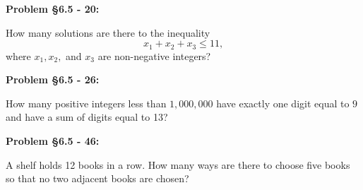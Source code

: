 \documentclass{article}
\newenvironment{problem}[1]
    {\begin{mdframed}[default]
    \textbf{Problem #1:}
    }
    {\end{mdframed}
    }
\begin{document}
\begin{problem}{\S 6.5 - 20}
How many solutions are there to the inequality
\[ x_1 + x_2 + x_3 \leq 11, \]
where $x_1, x_2,$ and $x_3$ are non-negative integers?
\end{problem}

\begin{problem}{\S 6.5 - 26}
How many positive integers less than $1,000,000$ have exactly one digit equal to $9$ and have a sum of digits equal to 13?
\end{problem}

\begin{problem}{\S 6.5 - 46}
A shelf holds 12 books in a row. How many ways are there to choose five books so that no two adjacent books are chosen?
\end{problem}
\end{document}
